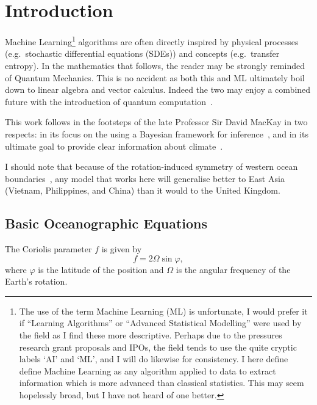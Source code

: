 %




\section{Introduction}
\label{sec:1_Introduction}

Machine Learning\footnote{The use of the term Machine Learning (ML) is unfortunate,
I would prefer it if ``Learning Algorithms'' or ``Advanced Statistical Modelling''
 were used by the field as I find these more descriptive.
  Perhaps due to the pressures research grant proposals and IPOs,
   the field tends to use the quite cryptic labels `AI' and `ML',
   and I will do likewise for consistency.
   I here define define Machine Learning as any algorithm applied to data
    to extract information which is more advanced than classical statistics.
    This may seem hopelessly broad, but I have not heard of one better. }
algorithms are often directly inspired by physical processes (e.g.\
stochastic differential equations (SDEs)) and concepts (e.g.\ transfer entropy).
In the mathematics that follows, the reader may be strongly reminded of Quantum Mechanics.
 This is no accident as both this and ML ultimately boil down to linear algebra and vector calculus.
  Indeed the two may enjoy a combined future with the introduction of quantum computation~\cite{biamonte2017quantum}.

This work follows in the footsteps of the late Professor Sir David MacKay
in two respects: in its focus on the using a Bayesian framework for inference~\cite{ITILA, MacKay91},
and in its ultimate goal to provide clear information about climate~\cite{mackay2008sustainable}.

I should note that because of the rotation-induced symmetry of western ocean boundaries~\cite{hogg1995western},
 any model that works here will generalise better to East Asia (Vietnam, Philippines,
  and China) than it would to the United Kingdom.

\subsection{Basic Oceanographic Equations}
The Coriolis parameter $f$ is given by
\begin{equation}
f=2 \Omega \sin \varphi,
\label{eq:coriolis}
\end{equation}
where $\varphi$ is the latitude of the position and $\Omega$ is the angular
 frequency of the Earth's rotation.

